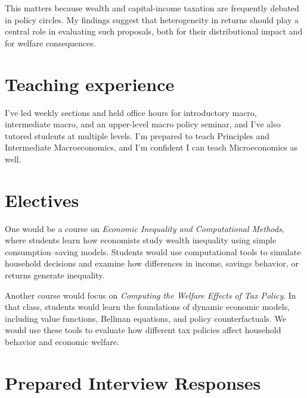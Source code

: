 \documentclass{scrartcl}
\begin{document}
This matters because wealth and capital-income taxation are frequently debated in policy circles. My findings suggest that heterogeneity in returns should play a central role in evaluating such proposals, both for their distributional impact and for welfare consequences.


\section{Teaching experience}

\par I’ve led weekly sections and held office hours for introductory macro, intermediate macro,  and an upper-level macro policy seminar, and I’ve also tutored students at multiple levels. I’m prepared to teach Principles and Intermediate Macroeconomics, and I’m confident I can teach Microeconomics as well. 

\section{Electives}

\par One would be a course on \textit{Economic Inequality and Computational Methods},
where students learn how economists study wealth inequality using simple
consumption–saving models. Students would use computational tools to simulate
household decisions and examine how differences in income, savings behavior,
or returns generate inequality.

\par Another course would focus on \textit{Computing the Welfare Effects of Tax Policy}.
In that class, students would learn the foundations of dynamic economic models,
including value functions, Bellman equations, and policy counterfactuals.
We would use these tools to evaluate how different tax policies affect household
behavior and economic welfare.

\section*{Prepared Interview Responses}
\end{document}
